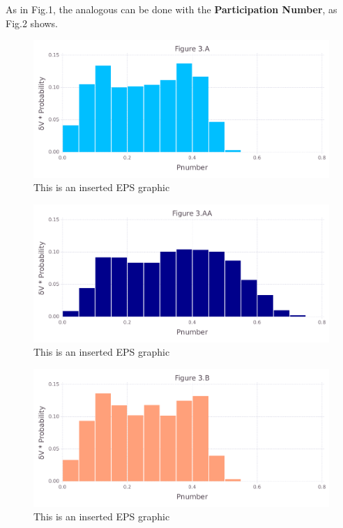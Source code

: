 \documentclass[10pt,letterpaper]{article}
\begin{document}
\clearpage
As in Fig.1, the analogous can be done with the \textbf{Participation Number}, as Fig.2 shows.

\begin{figure}[ht]
\begin{center}
\includegraphics[scale=0.5]{1prn/3afigure_hi-precision.pdf}
\caption{This is an inserted EPS graphic}
\label{fig7}
\end{center}
\end{figure}

\begin{figure}[ht]
\begin{center}
\includegraphics[scale=0.5]{1prn/3aafigure_hi-precision.pdf}
\caption{This is an inserted EPS graphic}
\label{fig8}
\end{center}
\end{figure}

\begin{figure}[ht]
\begin{center}
\includegraphics[scale=0.5]{1prn/3bfigure_hi-precision.pdf}
\caption{This is an inserted EPS graphic}
\label{fig10}
\end{center}
\end{figure}
\end{document}
